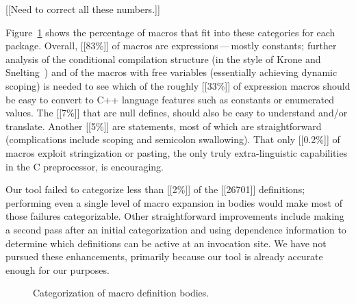 \documentclass[10pt]{article}
\begin{document}
[[Need to correct all these numbers.]]

Figure~\ref{fig:categorization} shows the percentage of macros that fit
into these categories for each package.  Overall, [[83\%]] of macros are
expressions\,---\,mostly constants; further analysis of the conditional
compilation structure (in the style of Krone and Snelting~\cite{Krone94})
and of the macros with free variables (essentially achieving dynamic
scoping) is needed to see which of the roughly [[33\%]] of expression macros
should be easy to convert to C++ language features such as constants or
enumerated values.  The [[7\%]] that are null
defines, should also be easy to understand and/or translate.  Another [[5\%]]
are statements, most of which are straightforward (complications include
scoping and semicolon swallowing).  That only [[0.2\%]] of macros exploit
stringization or pasting, the only truly extra-linguistic capabilities in
the C preprocessor, is encouraging.

Our tool failed to categorize less than [[2\%]] of the [[26701]] definitions;
performing even a single level of macro expansion in bodies would make most
of those failures categorizable.  Other straightforward improvements
include making a second pass after an initial categorization and using
dependence information to determine which definitions can be active at an
invocation site.  We have not pursued these enhancements, primarily because
our tool is already accurate enough for our purposes.


\begin{figure}
\centerline{}
\caption{Categorization of macro definition bodies.}
\label{fig:categorization}
\end{figure}




\end{document}
